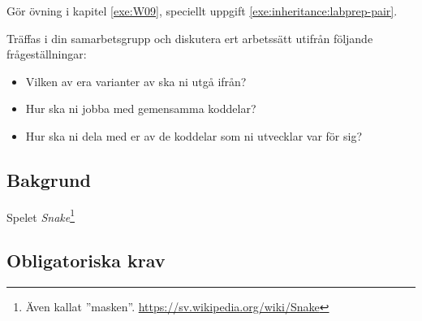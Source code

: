 
\Teamlab{\LabWeekNINE}

\begin{Goals}

\end{Goals}

\begin{Preparations}
\item Gör övning {\tt \ExeWeekNINE} i kapitel \ref{exe:W09}, speciellt uppgift \ref{exe:inheritance:labprep-pair}.

\item Träffas i din samarbetsgrupp och diskutera ert arbetssätt utifrån följande frågeställningar:
\begin{itemize}
  \item Vilken av era varianter av  ska ni utgå ifrån?
  \item Hur ska ni jobba med gemensamma koddelar?
  \item Hur ska ni dela med er av de koddelar som ni utvecklar var för sig?
\end{itemize}

\end{Preparations}

\subsection{Bakgrund}

Spelet \emph{Snake}\footnote{Även kallat ''masken''. \url{https://sv.wikipedia.org/wiki/Snake}}

\subsection{Obligatoriska krav}

